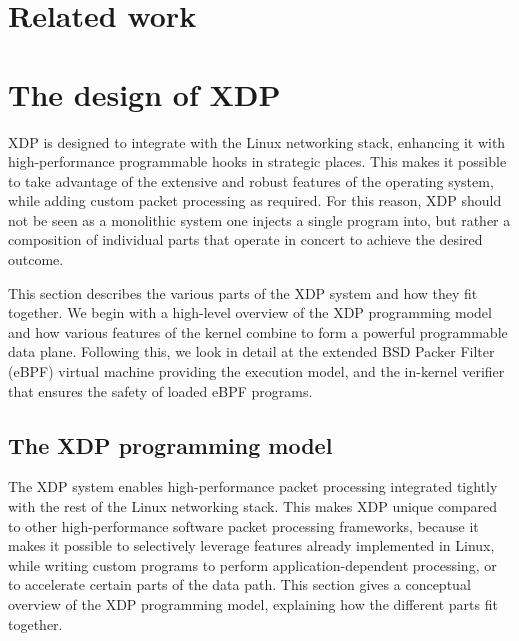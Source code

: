 \documentclass[10pt]{sig-alternate-05-2015}
\begin{document}
\section{Related work}
\label{sec:related-work}
\section{The design of XDP}
\label{sec:design}
XDP is designed to integrate with the Linux networking stack, enhancing it with
high-performance programmable hooks in strategic places. This makes it possible
to take advantage of the extensive and robust features of the operating system,
while adding custom packet processing as required. For this reason, XDP should
not be seen as a monolithic system one injects a single program into, but rather
a composition of individual parts that operate in concert to achieve the desired
outcome.

This section describes the various parts of the XDP system and how they fit
together. We begin with a high-level overview of the XDP programming model and
how various features of the kernel combine to form a powerful programmable data
plane. Following this, we look in detail at the extended BSD Packer Filter
(eBPF) virtual machine providing the execution model, and the in-kernel verifier
that ensures the safety of loaded eBPF programs.

\subsection{The XDP programming model}
\label{sec:prog-model}
The XDP system enables high-performance packet processing integrated tightly
with the rest of the Linux networking stack. This makes XDP unique compared to
other high-performance software packet processing frameworks, because it makes
it possible to selectively leverage features already implemented in Linux, while
writing custom programs to perform application-dependent processing, or to
accelerate certain parts of the data path. This section gives a conceptual
overview of the XDP programming model, explaining how the different parts fit
together.
\end{document}
